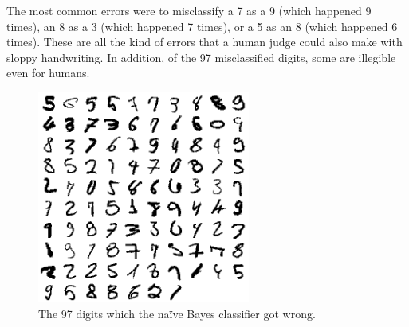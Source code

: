 \documentclass[11pt]{article}
\begin{document}
The most common errors were to misclassify a 7 as a 9 (which happened 9 times), an 8 as
a 3 (which happened 7 times), or a 5 as an 8 (which happened 6 times). These are all the
kind of errors that a human judge could also make with sloppy handwriting. In addition,
of the 97 misclassified digits, some are illegible even for humans.

\begin{figure}[h!]
\centering
\includegraphics[height=2.75in, width=2.75in]{digits.png}
\caption{The 97 digits which the na{\"i}ve Bayes classifier got wrong.}
\label{nbc_digits}
\end{figure}
\end{document}
